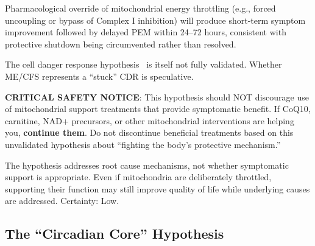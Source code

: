 \begin{prediction}
\label{pred:protective-throttle}
Pharmacological override of mitochondrial energy throttling (e.g., forced uncoupling or bypass of Complex I inhibition) will produce short-term symptom improvement followed by delayed PEM within 24--72 hours, consistent with protective shutdown being circumvented rather than resolved.
\end{prediction}

\begin{warning}
The cell danger response hypothesis~\cite{Naviaux2014cdr} is itself not fully validated. Whether ME/CFS represents a ``stuck'' CDR is speculative.

\textbf{CRITICAL SAFETY NOTICE}: This hypothesis should NOT discourage use of mitochondrial support treatments that provide symptomatic benefit. If CoQ10, carnitine, NAD+ precursors, or other mitochondrial interventions are helping you, \textbf{continue them}. Do not discontinue beneficial treatments based on this unvalidated hypothesis about ``fighting the body's protective mechanism.''

The hypothesis addresses root cause mechanisms, not whether symptomatic support is appropriate. Even if mitochondria are deliberately throttled, supporting their function may still improve quality of life while underlying causes are addressed. Certainty: Low.
\end{warning}

\subsection{The ``Circadian Core'' Hypothesis}
\label{sec:circadian-core}

